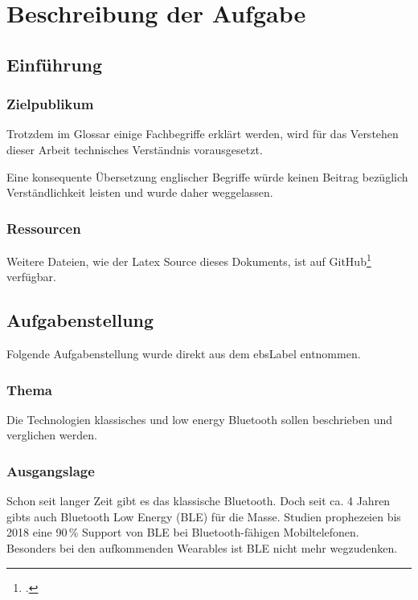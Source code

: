 \chapter{Beschreibung der Aufgabe}

\section{Einführung}
\subsection{Zielpublikum}
Trotzdem im Glossar einige Fachbegriffe erklärt werden, wird für das Verstehen dieser Arbeit technisches Verständnis vorausgesetzt.

Eine konsequente Übersetzung englischer Begriffe würde keinen Beitrag bezüglich Verständlichkeit leisten und wurde daher weggelassen.

\subsection{Ressourcen}
Weitere Dateien, wie der Latex Source dieses Dokuments, ist auf GitHub\footcite{GitHub_ble-seminar_2015-04-17} verfügbar.

\section{Aufgabenstellung}
Folgende Aufgabenstellung wurde direkt aus dem \gls{ebsLabel} entnommen.

\subsection{Thema}
Die Technologien klassisches und low energy Bluetooth sollen beschrieben und verglichen werden.

\subsection{Ausgangslage}
Schon seit langer Zeit gibt es das klassische Bluetooth. Doch seit ca. 4 Jahren gibts auch Bluetooth Low Energy (BLE) für die Masse. Studien prophezeien bis 2018 eine 90\,\% Support von BLE bei Bluetooth-fähigen Mobiltelefonen.
Besonders bei den aufkommenden Wearables ist BLE nicht mehr wegzudenken.


